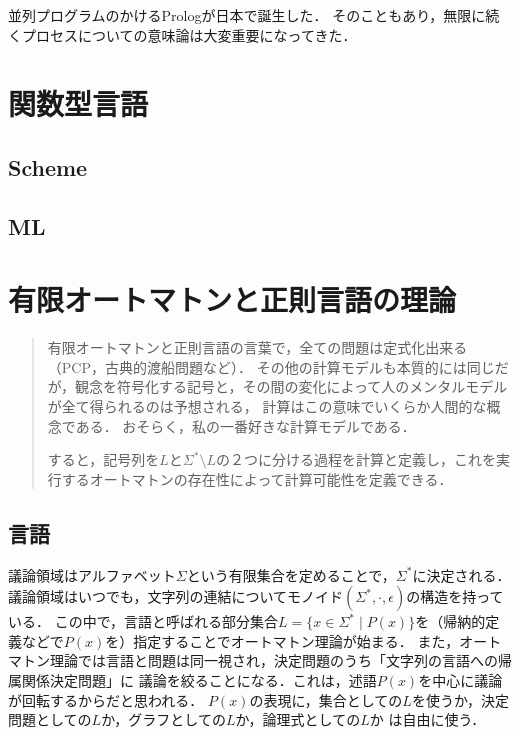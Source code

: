 \documentclass[uplatex, 12pt, dvipdfmx]{jsreport}
\begin{document}
並列プログラムのかけるPrologが日本で誕生した．
そのこともあり，無限に続くプロセスについての意味論は大変重要になってきた．

\chapter{関数型言語}

\section{Scheme}

\section{ML}

\chapter{有限オートマトンと正則言語の理論}

\begin{quotation}
    有限オートマトンと正則言語の言葉で，全ての問題は定式化出来る（PCP，古典的渡船問題など）．
    その他の計算モデルも本質的には同じだが，観念を符号化する記号と，その間の変化によって人のメンタルモデルが全て得られるのは予想される，
    計算はこの意味でいくらか人間的な概念である．
    おそらく，私の一番好きな計算モデルである．

    すると，記号列を$L$と$\Sigma^*\setminus L$の２つに分ける過程を計算と定義し，これを実行するオートマトンの存在性によって計算可能性を定義できる．
\end{quotation}

\section{言語}

\begin{screen}
    議論領域はアルファベット$\Sigma$という有限集合を定めることで，$\Sigma^*$に決定される．
    議論領域はいつでも，文字列の連結についてモノイド$(\Sigma^*,\cdot,\epsilon)$の構造を持っている．
    この中で，言語と呼ばれる部分集合$L=\{x\in\Sigma^*\mid P(x)\}$を（帰納的定義などで$P(x)$を）指定することでオートマトン理論が始まる．
    また，オートマトン理論では言語と問題は同一視され，決定問題のうち「文字列の言語への帰属関係決定問題」に
    議論を絞ることになる．これは，述語$P(x)$を中心に議論が回転するからだと思われる．
    $P(x)$の表現に，集合としての$L$を使うか，決定問題としての$L$か，グラフとしての$L$か，論理式としての$L$か
    は自由に使う．
\end{screen}
\end{document}

